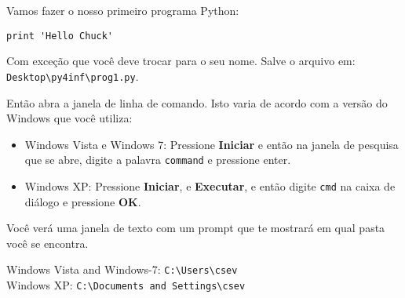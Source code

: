 Vamos fazer o nosso primeiro programa Python:
%

\beforeverb
\begin{verbatim}
print 'Hello Chuck'
\end{verbatim}
\afterverb


Com exceção que você deve trocar para o seu nome. Salve o arquivo
em: {\tt Desktop{\textbackslash}py4inf{\textbackslash}prog1.py}.
%

Então abra a janela de linha de comando. Isto varia de acordo com
a versão do Windows que você utiliza:
%

\begin{itemize}
\item Windows Vista e Windows 7: Pressione {\bf Iniciar}
e então na janela de pesquisa que se abre, digite a palavra
{\tt command} e pressione enter.
%

\item Windows XP: Pressione {\bf Iniciar}, e {\bf Executar}, e 
então digite {\tt cmd} na caixa de diálogo e pressione {\bf OK}.
\end{itemize}

Você verá uma janela de texto com um prompt que te mostrará
em qual pasta você se encontra.

Windows Vista and Windows-7: {\tt C:{\textbackslash}Users{\textbackslash}csev}\\
Windows XP: {\tt C:{\textbackslash}Documents and Settings{\textbackslash}csev}

